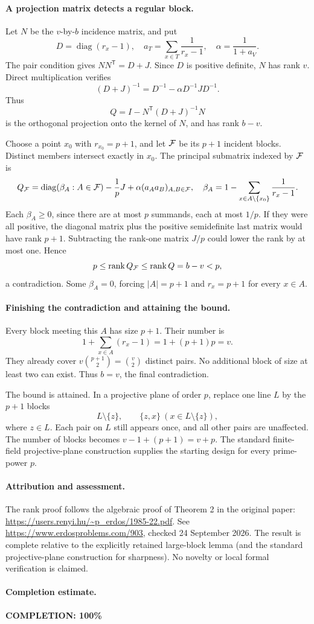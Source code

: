 \paragraph{A projection matrix detects a regular block.}
Let \(N\) be the \(v\)-by-\(b\) incidence matrix, and put
\[
 D=\operatorname{diag}(r_x-1),\quad
 a_T=\sum_{x\in T}\frac1{r_x-1},\quad
 \alpha=\frac1{1+a_V}.
\]
The pair condition gives \(NN^{\mathsf T}=D+J\).
Since \(D\) is positive definite, \(N\) has rank \(v\).
Direct multiplication verifies
\[
 (D+J)^{-1}=D^{-1}-\alpha D^{-1}JD^{-1}.
\]
Thus
\[
 Q=I-N^{\mathsf T}(D+J)^{-1}N
\]
is the orthogonal projection onto the kernel of \(N\),
and has rank \(b-v\).

Choose a point \(x_0\) with \(r_{x_0}=p+1\), and let
\({\cal F}\) be its \(p+1\) incident blocks.
Distinct members intersect exactly in \(x_0\).
The principal submatrix indexed by \({\cal F}\) is
\[
 Q_{\cal F}=\operatorname{diag}(\beta_A:A\in{\cal F})
                 -\frac1pJ+\alpha(a_Aa_B)_{A,B\in{\cal F}},
 \quad
 \beta_A=1-\sum_{x\in A\setminus\{x_0\}}\frac1{r_x-1}.
\]
Each \(\beta_A\geq0\), since there are at most \(p\)
summands, each at most \(1/p\).
If they were all positive, the diagonal matrix plus
the positive semidefinite last matrix would have rank
\(p+1\). Subtracting the rank-one matrix \(J/p\)
could lower the rank by at most one. Hence
\[
 p\leq\operatorname{rank}Q_{\cal F}
       \leq\operatorname{rank}Q=b-v<p,
\]
a contradiction. Some \(\beta_A=0\), forcing \(|A|=p+1\)
and \(r_x=p+1\) for every \(x\in A\).

\paragraph{Finishing the contradiction and attaining the bound.}
Every block meeting this \(A\) has size \(p+1\).
Their number is
\[
 1+\sum_{x\in A}(r_x-1)=1+(p+1)p=v.
\]
They already cover
\(v\binom{p+1}{2}=\binom v2\) distinct pairs.
No additional block of size at least two can exist.
Thus \(b=v\), the final contradiction.

The bound is attained. In a projective plane of order \(p\),
replace one line \(L\) by the \(p+1\) blocks
\[
 L\setminus\{z\},\qquad \{z,x\}\ (x\in L\setminus\{z\}),
\]
where \(z\in L\). Each pair on \(L\) still appears once,
and all other pairs are unaffected.
The number of blocks becomes \(v-1+(p+1)=v+p\).
The standard finite-field projective-plane construction
supplies the starting design for every prime-power \(p\).

\paragraph{Attribution and assessment.}
The rank proof follows the algebraic proof of Theorem 2
in the original paper:
\url{https://users.renyi.hu/~p_erdos/1985-22.pdf}.
See \url{https://www.erdosproblems.com/903}, checked
24 September 2026. The result is complete relative to
the explicitly retained large-block lemma (and the
standard projective-plane construction for sharpness).
No novelty or local formal verification is claimed.

\paragraph{Completion estimate.}
\textbf{COMPLETION: 100\%}
